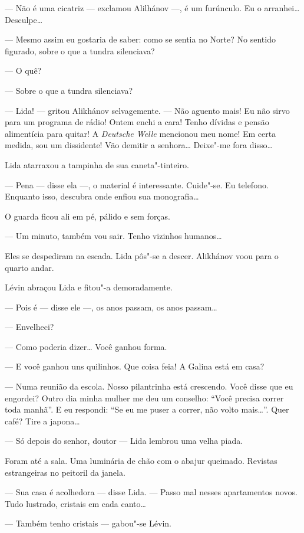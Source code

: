 --- Não é uma cicatriz --- exclamou Alilhánov ---, é um furúnculo. Eu o
arranhei\ldots{} Desculpe\ldots{}

--- Mesmo assim eu gostaria de saber: como se sentia no Norte? No
sentido figurado, sobre o que a tundra silenciava?

--- O quê?

--- Sobre o que a tundra silenciava?

--- Lida! --- gritou Alikhánov selvagemente. --- Não aguento mais! Eu
não sirvo para um programa de rádio! Ontem enchi a cara! Tenho dívidas e
pensão alimentícia para quitar! A \emph{Deutsche Welle} mencionou meu
nome! Em certa medida, sou um dissidente! Vão demitir a senhora\ldots{}
Deixe"-me fora disso\ldots{}

Lida atarraxou a tampinha de sua caneta"-tinteiro.

--- Pena --- disse ela ---, o material é interessante. Cuide"-se. Eu
telefono. Enquanto isso, descubra onde enfiou sua monografia\ldots{}

O guarda ficou ali em pé, pálido e sem forças.

--- Um minuto, também vou sair. Tenho vizinhos humanos\ldots{}

Eles se despediram na escada. Lida pôs"-se a descer. Alikhánov voou para
o quarto andar.

Lévin abraçou Lida e fitou"-a demoradamente.

--- Pois é --- disse ele ---, os anos passam, os anos passam\ldots{}

--- Envelheci?

--- Como poderia dizer\ldots{} Você ganhou forma.

--- E você ganhou uns quilinhos. Que coisa feia! A Galina está em casa?

--- Numa reunião da escola. Nosso pilantrinha está crescendo. Você disse
que eu engordei? Outro dia minha mulher me deu um conselho: ``Você
precisa correr toda manhã''. E eu respondi: ``Se eu me puser a correr,
não volto mais\ldots{}''. Quer café? Tire a japona\ldots{}

--- Só depois do senhor, doutor --- Lida lembrou uma velha piada.

Foram até a sala. Uma luminária de chão com o abajur queimado. Revistas
estrangeiras no peitoril da janela.

--- Sua casa é acolhedora --- disse Lida. --- Passo mal nesses
apartamentos novos. Tudo lustrado, cristais em cada canto\ldots{}

--- Também tenho cristais --- gabou"-se Lévin.

